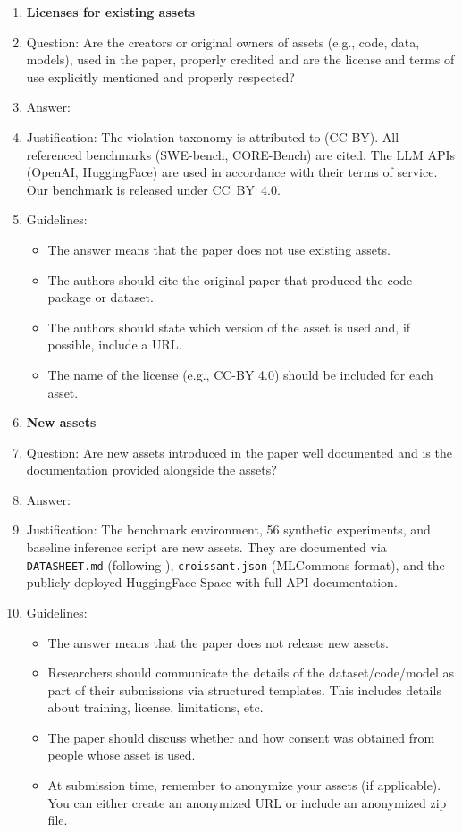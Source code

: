 \begin{enumerate}
\item {\bf Licenses for existing assets}
    \item[] Question: Are the creators or original owners of assets (e.g., code, data, models), used in the paper, properly credited and are the license and terms of use explicitly mentioned and properly respected?
    \item[] Answer: \answerYes{}
    \item[] Justification: The violation taxonomy is attributed to \citet{kapoor2023leakage} (CC BY). All referenced benchmarks (SWE-bench, CORE-Bench) are cited. The LLM APIs (OpenAI, HuggingFace) are used in accordance with their terms of service. Our benchmark is released under CC~BY~4.0.
    \item[] Guidelines: \begin{itemize}
        \item The answer \answerNA{} means that the paper does not use existing assets.
        \item The authors should cite the original paper that produced the code package or dataset.
        \item The authors should state which version of the asset is used and, if possible, include a URL.
        \item The name of the license (e.g., CC-BY 4.0) should be included for each asset.
    \end{itemize}

\item {\bf New assets}
    \item[] Question: Are new assets introduced in the paper well documented and is the documentation provided alongside the assets?
    \item[] Answer: \answerYes{}
    \item[] Justification: The benchmark environment, 56 synthetic experiments, and baseline inference script are new assets. They are documented via \texttt{DATASHEET.md} (following \citet{gebru2021datasheets}), \texttt{croissant.json} (MLCommons format), and the publicly deployed HuggingFace Space with full API documentation.
    \item[] Guidelines: \begin{itemize}
        \item The answer \answerNA{} means that the paper does not release new assets.
        \item Researchers should communicate the details of the dataset/code/model as part of their submissions via structured templates. This includes details about training, license, limitations, etc.
        \item The paper should discuss whether and how consent was obtained from people whose asset is used.
        \item At submission time, remember to anonymize your assets (if applicable). You can either create an anonymized URL or include an anonymized zip file.
    \end{itemize}


\end{enumerate}
